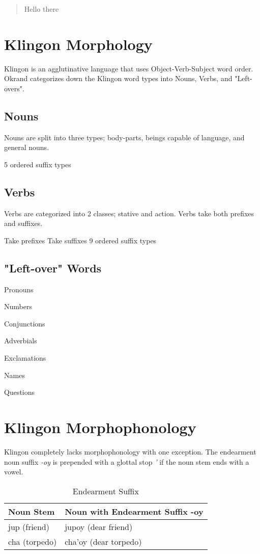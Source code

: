 \documentclass[11pt]{article}
\begin{document}
\begin{quote}
Hello there
\end{quote}

\section{Klingon Morphology}

Klingon is an agglutinative language that uses Object-Verb-Subject word order. Okrand categorizes down the Klingon word types into Nouns, Verbs, and "Left-overs".

\subsection {Nouns}

Nouns are split into three types; body-parts, beings capable of language, and general nouns.

5 ordered suffix types

\subsection {Verbs}

Verbs are categorized into 2 classes; stative and action. Verbs take both prefixes and suffixes.

Take prefixes
Take suffixes
9 ordered suffix types

\subsection {"Left-over" Words}

Pronouns

Numbers

Conjunctions

Adverbials

Exclamations

Names

Questions

\section{Klingon Morphophonology}

Klingon completely lacks morphophonology with one exception. The endearment noun suffix \textit{-oy} is prepended with a glottal stop \textit{'} if the noun stem ends with a vowel.

\begin{table}[h]
\begin{center}
\begin{tabular}{|l|l|}
\hline \bf Noun Stem & \bf Noun with Endearment Suffix -oy \\ \hline
jup (friend) & jupoy (dear friend) \\
cha (torpedo) & cha'oy (dear torpedo) \\
\hline
\end{tabular}
\end{center}
\caption{\label{font-table} Endearment Suffix }
\end{table}
\end{document}
